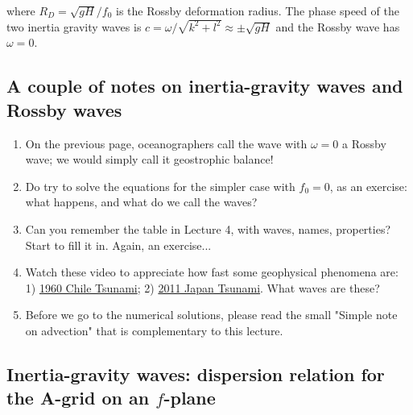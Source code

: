 where $R_D = \sqrt{gH}/f_0$ is the Rossby deformation radius. The
phase speed of the two inertia gravity waves is $c=\omega/\sqrt{k^2+l^2}
\approx \pm\sqrt{gH}$ and the Rossby wave has $\omega=0$. 


\subsection{A couple of notes on inertia-gravity waves and Rossby waves}

\begin{enumerate}
	\item On the previous page, oceanographers call the wave with $\omega=0$ a Rossby wave; we would simply call it geostrophic balance!
	\item Do try to solve the equations for the simpler case with $f_0=0$, as an exercise: what happens, and what do we call the waves?
	\item Can you remember the table in Lecture 4, with waves, names, properties? Start to fill it in. Again, an exercise...
	\item Watch these video to appreciate how fast some geophysical phenomena are: 1) \href{https://www.youtube.com/watch?v=oeKewmAoBEM}{1960 Chile Tsunami}; 2) \href{https://www.youtube.com/watch?v=jH3-hQjTGDQ}{2011 Japan Tsunami}. What waves are these?
	\item Before we go to the numerical solutions, please read the small "Simple note on advection" that is complementary to this lecture.
\end{enumerate}

\subsection{Inertia-gravity waves: dispersion relation for the A-grid on an $f$-plane}

